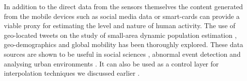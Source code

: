 In addition to the direct data from the sensors themselves the content generated from the mobile devices such as social media data or smart-cards \cite{zhong2016} can provide a viable proxy for estimating the level and nature of human activity.
The use of geo-located tweets on the study of small-area dynamic population estimation \citep{ordonez2012, marchetti2015, mckenzie2015, lansley2016a}, geo-demographics \citep{bawa-cavia2011, longley2015, lansley2016b} and global mobility \citep{hawelka2014} has been thoroughly explored.
These data sources are shown to be useful in social sciences \citep{crane2008}, abnormal event detection \citep{chae2012} and analysing urban environments \citep{sagl2012}.
It can also be used as a control layer for interpolation techniques we discussed earlier \citep{lin2015}.
